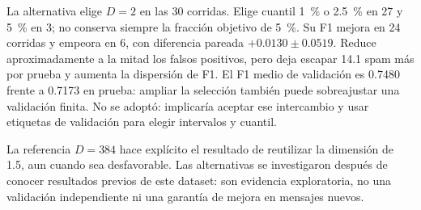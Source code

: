 La alternativa elige $D=2$ en las 30 corridas. Elige cuantil 1~\% o
2.5~\% en 27 y 5~\% en 3; no conserva siempre la fracción objetivo
de 5~\%. Su F1 mejora en 24 corridas y empeora en 6, con diferencia pareada
$+0.0130\pm0.0519$. Reduce aproximadamente a la mitad los falsos positivos,
pero deja escapar 14.1 spam más por prueba y aumenta la dispersión de F1.
El F1 medio de validación es 0.7480 frente a 0.7173 en prueba: ampliar la
selección también puede sobreajustar una validación finita. No se adoptó:
implicaría aceptar ese intercambio y usar etiquetas de validación para elegir
intervalos y cuantil.

La referencia $D=384$ hace explícito el resultado de reutilizar la dimensión
de 1.5, aun cuando sea desfavorable. Las alternativas se investigaron después
de conocer resultados previos de este dataset: son evidencia exploratoria,
no una validación independiente ni una garantía de mejora en mensajes nuevos.
